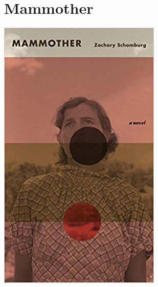 \documentclass{tufte-handout}
\makeatletter
\newcommand{\varcaption}[2][0pt]{%
  \gsetlength{\@tufte@caption@vertical@offset}{-#1}%
  \gdef\@tufte@stored@varcaption{#2}%
}
\gdef\@tufte@stored@varcaption{} %
\makeatother
\begin{document}
\section*{Mammother}
\begin{marginfigure}[10\baselineskip]
   \includegraphics[width=\linewidth]{images/mammother.jpg}
   \varcaption{\href{http://www.featherproof.com/catalog/mammother}{Publisher Link}, \href{https://www.amazon.com/Mammother-Zachary-Schomburg/dp/1943888108/}{Amazon Link}}
\end{marginfigure}
\end{document}
